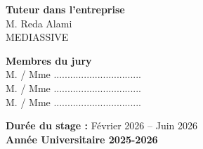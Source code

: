 \begin{titlepage}
\begin{center}
    \begin{minipage}[t]{0.48\textwidth}
        \centering
        \large \textbf{Tuteur dans l'entreprise}\\[0.25cm]
        M. Reda Alami\\
        MEDIASSIVE
    \end{minipage}
    \hfill
    \begin{minipage}[t]{0.48\textwidth}
        \centering
        \large \textbf{Membres du jury}\\[0.25cm]
        M. / Mme ................................\\[0.15cm]
        M. / Mme ................................\\[0.15cm]
        M. / Mme ................................
    \end{minipage}

    \vspace*{1.2cm}

    \textbf{Durée du stage :} Février 2026 -- Juin 2026\\[0.25cm]
    \textbf{Année Universitaire 2025-2026}
    
\end{center}


\end{titlepage}

